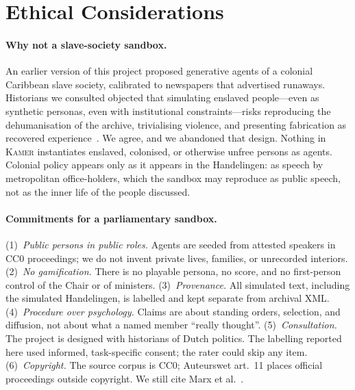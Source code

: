 \documentclass[sigconf,review,anonymous]{acmart}
\newcommand{\sys}{\textsc{Kamer}}
\begin{document}
\section{Ethical Considerations}
\label{sec:ethics}

\paragraph{Why not a slave-society sandbox.} An earlier version of this
project proposed generative agents of a colonial Caribbean slave society,
calibrated to newspapers that advertised runaways. Historians we consulted
objected that simulating enslaved people---even as synthetic personas, even
with institutional constraints---risks reproducing the dehumanisation of
the archive, trivialising violence, and presenting fabrication as recovered
experience~\cite{hartman2008venus,fuentes2016dispossessed}. We agree, and
we abandoned that design. Nothing in \sys{} instantiates enslaved,
colonised, or otherwise unfree persons as agents. Colonial policy appears
only as it appears in the Handelingen: as speech by metropolitan
office-holders, which the sandbox may reproduce as public speech, not as
the inner life of the people discussed.

\paragraph{Commitments for a parliamentary sandbox.}
(1)~\emph{Public persons in public roles.} Agents are seeded from
attested speakers in CC0 proceedings; we do not invent private lives,
families, or unrecorded interiors.
(2)~\emph{No gamification.} There is no playable persona, no score, and
no first-person control of the Chair or of ministers.
(3)~\emph{Provenance.} All simulated text, including the simulated
Handelingen, is labelled and kept separate from archival XML.
(4)~\emph{Procedure over psychology.} Claims are about standing orders,
selection, and diffusion, not about what a named member ``really thought''.
(5)~\emph{Consultation.} The project is designed with historians of
Dutch politics. The labelling reported here used informed, task-specific
consent; the rater could skip any item.
(6)~\emph{Copyright.} The source corpus is CC0; Auteurswet art.~11
places official proceedings outside copyright. We still cite Marx et
al.~\cite{marx2012dutchparl}.

\end{document}
